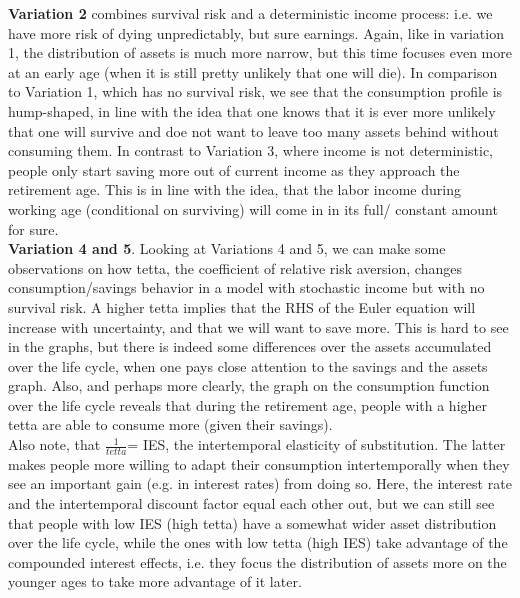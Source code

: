\documentclass[12pt,a4paper]{article}
\begin{document}
\textbf{Variation 2} combines survival risk and a deterministic income process: i.e. we have more risk of dying unpredictably, but sure earnings. Again, like in variation 1, the distribution of assets is much more narrow, but this time focuses even more at an early age (when it is still pretty unlikely that one will die). In comparison to Variation 1, which has no survival risk, we see that the consumption profile is hump-shaped, in line with the idea that one knows that it is ever more unlikely that one will survive and doe not want to leave too many assets behind without consuming them. In contrast to Variation 3, where income is not deterministic, people only start saving more out of current income as they approach the retirement age. This is in line with the idea, that the labor income during working age (conditional on surviving) will come in in its full/ constant amount for sure.\\

\textbf{Variation 4 and 5}. Looking at Variations 4 and 5, we can make some observations on how tetta, the coefficient of relative risk aversion, changes consumption/savings behavior in a model with stochastic income but with no survival risk. A higher tetta implies that the RHS of the Euler equation will increase with uncertainty, and that we will want to save more. This is hard to see in the graphs, but there is indeed some differences over the assets accumulated over the life cycle, when one pays close attention to the savings and the assets graph. Also, and perhaps more clearly, the graph on the consumption function over the life cycle reveals that during the retirement age, people with a higher tetta are able to consume more (given their savings).\\

Also note, that $\frac{1}{tetta}$= IES, the intertemporal elasticity of substitution. The latter makes people more willing to adapt their consumption intertemporally when they see an important gain (e.g. in interest rates) from doing so. Here, the interest rate and the intertemporal discount factor equal each other out, but we can still see that people with low IES (high tetta) have a somewhat wider asset distribution over the life cycle, while the ones with low tetta (high IES) take advantage of the compounded interest effects, i.e. they focus the distribution of assets more on the younger ages to take more advantage of it later.\\
\end{document}
